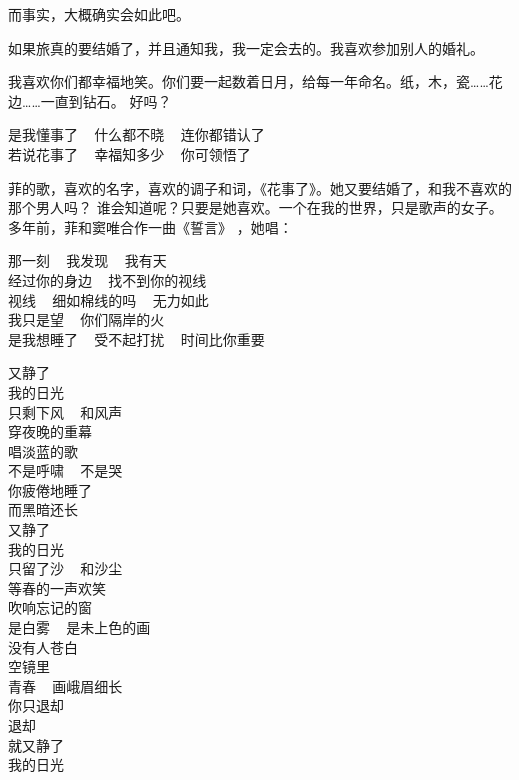 \documentclass[12pt,a4paper]{article}
\begin{document}
		而事实，大概确实会如此吧。

		如果旅真的要结婚了，并且通知我，我一定会去的。我喜欢参加别人的婚礼。

		我喜欢你们都幸福地笑。你们要一起数着日月，给每一年命名。纸，木，瓷……花边……一直到钻石。
	好吗？

		\longpoem{}{}{}
		是我懂事了 ~ 什么都不晓 ~ 连你都错认了 \\
		若说花事了 ~ 幸福知多少 ~ 你可领悟了
		\endlongpoem

		菲的歌，喜欢的名字，喜欢的调子和词，《花事了》。她又要结婚了，和我不喜欢的那个男人吗？
	谁会知道呢？只要是她喜欢。一个在我的世界，只是歌声的女子。多年前，菲和窦唯合作一曲《誓言》
	，她唱：

		\longpoem{}{}{}
		那一刻 ~ 我发现 ~ 我有天 \\
		经过你的身边 ~ 找不到你的视线 \\
		视线 ~ 细如棉线的吗 ~ 无力如此 \\
		我只是望 ~ 你们隔岸的火 \\
		是我想睡了 ~ 受不起打扰 ~ 时间比你重要
		\endlongpoem

	\endwriting



		\longpoem{}{}{}
		又静了 \\
		我的日光 \\
		只剩下风 ~ 和风声 \\
		穿夜晚的重幕 \\
		唱淡蓝的歌 \\
		不是呼啸 ~ 不是哭 \\
		你疲倦地睡了 \\
		而黑暗还长 \\
		又静了 \\
		我的日光 \\
		只留了沙 ~ 和沙尘 \\
		等春的一声欢笑 \\
		吹响忘记的窗 \\
		是白雾 ~ 是未上色的画 \\
		没有人苍白 \\
		空镜里 \\
		青春 ~ 画峨眉细长 \\
		你只退却 \\
		退却 \\
		就又静了 \\
		我的日光
		\endlongpoem
	\endwriting


\end{document}
